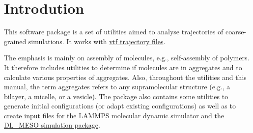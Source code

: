 \chapter{Introdution}

This software package is a set of utilities aimed to analyse trajectories
of coarse-grained simulations. It works with
\href{https://github.com/olenz/vtfplugin/wiki/VTF-format}{vtf trajectory
files}.

The emphasis is mainly on assembly of molecules, e.g., self-assembly of
polymers. It therefore includes utilities to determine if molecules are in
aggregates and to calculate various properties of aggregates. Also,
throughout the utilities and this manual, the term aggregates refers to any
supramolecular structure (e.g., a bilayer, a micelle, or a vesicle).  The
package also contains some utilities to generate initial configurations (or
adapt existing configurations) as well as to create input files for the
\href{https://lammps.sandia.gov/}{LAMMPS molecular dynamic simulator} and
the
\href{https://www.scd.stfc.ac.uk/Pages/DL_MESO.aspx}{DL\_MESO
simulation package}.

